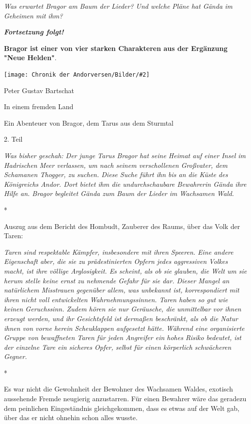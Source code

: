 \documentclass[10pt, a4paper, oneside]{book}
\newcommand{\bildmitts}[2][height=0.32\textwidth,width=0.48\textwidth,keepaspectratio]{%
    \begin{center}
        \texttt{[image: Chronik der Andorversen/Bilder/\#2]}
    \end{center}
}
\begin{document}
\begin{multicols}{2}
\textit{Was erwartet Bragor am Baum der Lieder? Und welche Pläne hat Gända im Geheimen mit ihm?}

\textbf{\textit{Fortsetzung folgt!}}\bigskip

\textbf{Bragor ist einer von vier starken Charakteren aus der Ergänzung "Neue Helden"}.\bigskip

\bildmitts{In einem fremden Land Bild 2.jpg}

Peter Gustav Bartschat

In einem fremden Land

Ein Abenteuer von Bragor, dem Tarus aus dem Sturmtal

2. Teil\bigskip


\textit{Was bisher geschah: Der junge Tarus Bragor hat seine Heimat auf einer Insel im Hadrischen Meer verlassen, um nach seinem verschollenen Großvater, dem Schamanen Thogger, zu suchen. Diese Suche führt ihn bis an die Küste des Königreichs Andor. Dort bietet ihm die undurchschaubare Bewahrerin Gända ihre Hilfe an. Bragor begleitet Gända zum Baum der Lieder im Wachsamen Wald.}

\begin{center}
    *
\end{center}

Auszug aus dem Bericht des Hombudt, Zauberer des Raums, über das Volk der 
Taren: 

\textit{Taren sind respektable Kämpfer, insbesondere mit ihren Speeren. Eine andere Eigenschaft aber, die sie zu prädestinierten Opfern jedes aggressiven Volkes macht, ist ihre völlige Arglosigkeit. Es scheint, als ob sie glauben, die Welt um sie herum stelle keine ernst zu nehmende Gefahr für sie dar. Dieser Mangel an natürlichem Misstrauen gegenüber allem, was unbekannt ist, korrespondiert mit ihren nicht voll entwickelten Wahrnehmungssinnen. Taren haben so gut wie keinen Geruchssinn. Zudem hören sie nur Geräusche, die unmittelbar vor ihnen erzeugt werden, und ihr Gesichtsfeld ist dermaßen beschränkt, als ob die Natur ihnen von vorne herein Scheuklappen aufgesetzt hätte. Während eine organisierte Gruppe von bewaffneten Taren für jeden Angreifer ein hohes Risiko bedeutet, ist der einzelne Tare ein sicheres Opfer, selbst für einen körperlich schwächeren Gegner. }

\begin{center}
    *
\end{center}

Es war nicht die Gewohnheit der Bewohner des Wachsamen Waldes, exotisch aussehende Fremde neugierig anzustarren. Für einen Bewahrer wäre das geradezu dem peinlichen Eingeständnis gleichgekommen, dass es etwas auf der Welt gab, über das er nicht ohnehin schon alles wusste. 


\end{multicols}
\end{document}
